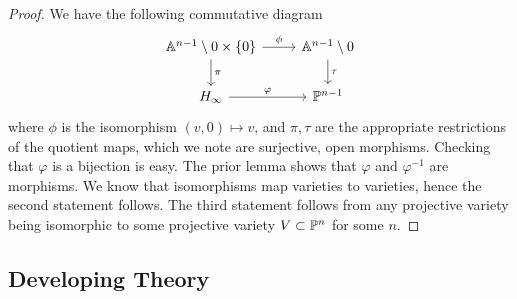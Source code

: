     \begin{proof}
        We have the following commutative diagram 
        $$
            \begin{tikzcd}
                \A^{n-1}\setminus 0 \times \{0\} \arrow[r, "\phi"] \arrow[d, "\pi"] & \A^{n-1}\setminus 0\arrow[d, "\tau"] \\
                H_\infty \arrow[r,"\varphi"] & \Pp^{n-1}
            \end{tikzcd}
        $$
        where $\phi$ is the isomorphism $(v,0)\mapsto v$, and $\pi,\tau$ are the appropriate restrictions of the quotient maps, which we note are surjective, open morphisms. Checking that $\varphi$ is a bijection is easy. The prior lemma shows that $\varphi$ and $\varphi^{-1}$ are morphisms. We know that isomorphisms map varieties to varieties, hence the second statement follows. The third statement follows from any projective variety being isomorphic to some projective variety $V\subset\mathbb{P}^n$ for some $n$.
    \end{proof}
    \subsection{Developing Theory}
